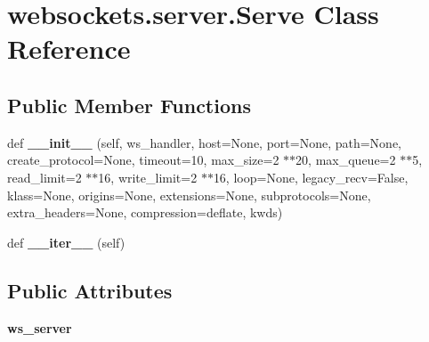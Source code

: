 \hypertarget{classwebsockets_1_1server_1_1_serve}{}\section{websockets.\+server.\+Serve Class Reference}
\label{classwebsockets_1_1server_1_1_serve}
\subsection*{Public Member Functions}
\begin{DoxyCompactItemize}
\item 
\mbox{\label{classwebsockets_1_1server_1_1_serve_ad9ba4edbde9beeca6961f4992f969baf}} 
def {\bfseries \+\_\+\+\_\+init\+\_\+\+\_\+} (self, ws\+\_\+handler, host=None, port=None, path=None, create\+\_\+protocol=None, timeout=10, max\+\_\+size=2 $\ast$$\ast$20, max\+\_\+queue=2 $\ast$$\ast$5, read\+\_\+limit=2 $\ast$$\ast$16, write\+\_\+limit=2 $\ast$$\ast$16, loop=None, legacy\+\_\+recv=False, klass=None, origins=None, extensions=None, subprotocols=None, extra\+\_\+headers=None, compression=\textquotesingle{}deflate\textquotesingle{}, kwds)
\item 
\mbox{\label{classwebsockets_1_1server_1_1_serve_a196af83330dcd88e664eeb146531809a}} 
def {\bfseries \+\_\+\+\_\+iter\+\_\+\+\_\+} (self)
\end{DoxyCompactItemize}
\subsection*{Public Attributes}
\begin{DoxyCompactItemize}
\item 
\mbox{\label{classwebsockets_1_1server_1_1_serve_af19e40394f32114492a240a29c99712c}} 
{\bfseries ws\+\_\+server}
\end{DoxyCompactItemize}


